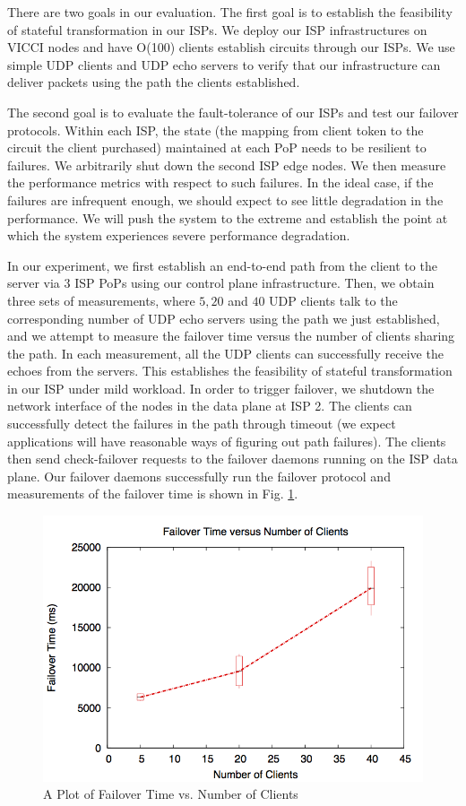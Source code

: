 \documentclass{article}
\begin{document}
There are two goals in our evaluation. The first goal is to establish
the feasibility of stateful transformation in our ISPs. We
deploy our ISP infrastructures on VICCI nodes and have O(100)
clients establish circuits through our ISPs. We use simple UDP clients
and UDP echo servers to verify that our infrastructure can deliver packets
using the path the clients established.

The second goal is to evaluate the fault-tolerance of our ISPs and test
our failover protocols.
 Within each ISP, the state (the mapping from client token to the circuit the
client purchased) maintained at each PoP needs to be resilient to
failures. We arbitrarily shut down the second ISP edge nodes. We
then measure the performance metrics with respect to such failures. In
the ideal case, if the failures are infrequent enough, we should
expect to see little degradation in the performance. We will push the
system to the extreme and establish the point at which the system
experiences severe performance degradation.

In our experiment, we first establish an end-to-end path from the client
to the server via 3 ISP PoPs using our control plane infrastructure.
Then, we obtain three sets of measurements, where
 $5, 20$ and $40$ UDP clients talk to the corresponding
number of UDP echo servers using the path we just established, and
we attempt to measure the failover time versus the number of clients
sharing the path.
In each measurement, all the UDP clients can successfully receive
the echoes from the servers. This establishes the feasibility of
stateful transformation in our ISP under mild workload.
In order to trigger failover, we shutdown the network interface of the
nodes in the data plane at ISP 2. The clients can successfully detect
the failures in the path through timeout (we expect applications will
have reasonable ways of figuring out path failures). The clients then
send check-failover requests to the failover daemons running on the
ISP data plane. Our failover daemons successfully run the failover
protocol and measurements of the failover time is shown in Fig. \ref{fig:failover}.

\begin{figure}
\includegraphics[width=\linewidth]{failoverTime_numClients}
\caption{A Plot of Failover Time vs. Number of Clients}
\label{fig:failover}
\end{figure}
\end{document}
